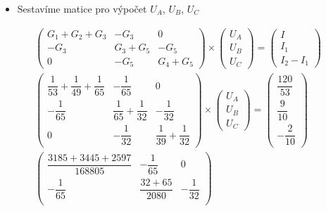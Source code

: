 \begin{itemize}
    \item Sestavíme matice pro výpočet $U_A$, $U_B$, $U_C$
\end{itemize}

\begin{center}
    \begin{gather*}
        \begin{pmatrix}
            G_1 + G_2 + G_3 & -G_3 & 0 \\[6pt]
            -G_3 & G_3 + G_5 & -G_5 \\[6pt]
            0 & -G_5 & G_4 + G_5
        \end{pmatrix} \times
        \begin{pmatrix}
            U_A \\[6pt]
            U_B \\[6pt]
            U_C
        \end{pmatrix} =
        \begin{pmatrix}
            I \\[6pt]
            I_1 \\[6pt]
            I_2 - I_1
        \end{pmatrix} \\[8pt]
        \begin{pmatrix}
            \dfrac{1}{53} + \dfrac{1}{49} + \dfrac{1}{65} & -\dfrac{1}{65} & 0 \\[8pt]
            -\dfrac{1}{65} & \dfrac{1}{65} + \dfrac{1}{32} & -\dfrac{1}{32} \\[8pt]
            0 & -\dfrac{1}{32} & \dfrac{1}{39} + \dfrac{1}{32}
        \end{pmatrix} \times
        \begin{pmatrix}
            U_A \\[8pt]
            U_B \\[8pt]
            U_C
        \end{pmatrix} =
        \begin{pmatrix}
            \dfrac{120}{53} \\[8pt]
            \dfrac{9}{10} \\[8pt]
            -\dfrac{2}{10}
        \end{pmatrix} \\[8pt]
        \begin{pmatrix}
            \dfrac{3185+3445+2597}{168805} & -\dfrac{1}{65} & 0 \\[8pt]
            -\dfrac{1}{65} & \dfrac{32+65}{2080} & -\dfrac{1}{32} \\[8pt]

\end{pmatrix}
\end{gather*}
\end{center}
